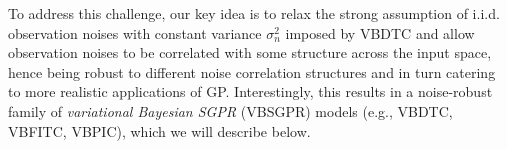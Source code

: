 \documentclass[conference]{IEEEtran}
\begin{document}
To address this challenge, our key idea is to relax the strong assumption of i.i.d. observation noises with constant variance $\sigma^2_n$ imposed by VBDTC and allow observation noises to be correlated with some structure across the input space, hence being robust to different noise correlation structures and in turn catering to more realistic applications of GP. 
Interestingly, this results in a noise-robust family of \emph{variational Bayesian SGPR} (VBSGPR) models (e.g., VBDTC, VBFITC, VBPIC), which we will describe below.
\end{document}
